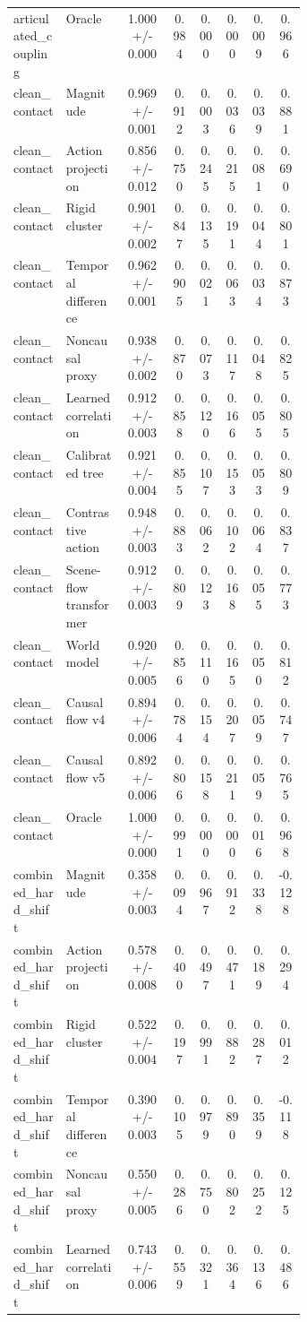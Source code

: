 \documentclass{article}
\begin{document}
\begin{center}
\begin{longtable}{p{0.18\linewidth}p{0.20\linewidth}cccccc}
articulated\_coupling & Oracle & 1.000 +/- 0.000 & 0.984 & 0.000 & 0.000 & 0.009 & 0.966\\
clean\_contact & Magnitude & 0.969 +/- 0.001 & 0.912 & 0.003 & 0.036 & 0.039 & 0.881\\
clean\_contact & Action projection & 0.856 +/- 0.012 & 0.750 & 0.245 & 0.215 & 0.081 & 0.690\\
clean\_contact & Rigid cluster & 0.901 +/- 0.002 & 0.847 & 0.135 & 0.191 & 0.044 & 0.801\\
clean\_contact & Temporal difference & 0.962 +/- 0.001 & 0.905 & 0.021 & 0.063 & 0.034 & 0.873\\
clean\_contact & Noncausal proxy & 0.938 +/- 0.002 & 0.870 & 0.073 & 0.117 & 0.048 & 0.825\\
clean\_contact & Learned correlation & 0.912 +/- 0.003 & 0.858 & 0.120 & 0.166 & 0.055 & 0.805\\
clean\_contact & Calibrated tree & 0.921 +/- 0.004 & 0.855 & 0.107 & 0.153 & 0.053 & 0.809\\
clean\_contact & Contrastive action & 0.948 +/- 0.003 & 0.883 & 0.062 & 0.102 & 0.064 & 0.837\\
clean\_contact & Scene-flow transformer & 0.912 +/- 0.003 & 0.809 & 0.123 & 0.168 & 0.055 & 0.773\\
clean\_contact & World model & 0.920 +/- 0.005 & 0.856 & 0.110 & 0.165 & 0.050 & 0.812\\
clean\_contact & Causal flow v4 & 0.894 +/- 0.006 & 0.784 & 0.154 & 0.207 & 0.059 & 0.747\\
clean\_contact & Causal flow v5 & 0.892 +/- 0.006 & 0.806 & 0.158 & 0.211 & 0.059 & 0.765\\
clean\_contact & Oracle & 1.000 +/- 0.000 & 0.991 & 0.000 & 0.000 & 0.016 & 0.968\\
combined\_hard\_shift & Magnitude & 0.358 +/- 0.003 & 0.094 & 0.967 & 0.912 & 0.338 & -0.128\\
combined\_hard\_shift & Action projection & 0.578 +/- 0.008 & 0.400 & 0.497 & 0.471 & 0.189 & 0.294\\
combined\_hard\_shift & Rigid cluster & 0.522 +/- 0.004 & 0.197 & 0.991 & 0.882 & 0.287 & 0.012\\
combined\_hard\_shift & Temporal difference & 0.390 +/- 0.003 & 0.105 & 0.979 & 0.890 & 0.359 & -0.118\\
combined\_hard\_shift & Noncausal proxy & 0.550 +/- 0.005 & 0.286 & 0.750 & 0.802 & 0.252 & 0.125\\
combined\_hard\_shift & Learned correlation & 0.743 +/- 0.006 & 0.559 & 0.321 & 0.364 & 0.136 & 0.486\\

\end{longtable}
\end{center}
\end{document}
